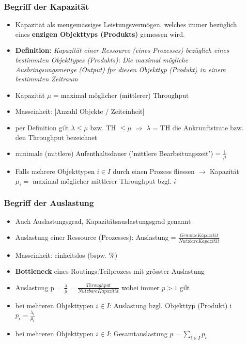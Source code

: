\documentclass{report}
\theoremstyle{definition}
\theoremstyle{example}
\begin{document}
      \subsubsection{Begriff der Kapazität}
\begin{itemize}
   \item Kapazität als mengemässiges Leistungsvermögen, welches immer bezüglich eines \textbf{enzigen Objekttyps (Produkts)} gemessen wird.\\
   \item \textbf{Definition:} \textit{Kapazität einer Ressource (eines Prozesses) bezüglich eines bestimmten Objekttypes (Produkts): Die maximal mögliche Ausbringsungsmenge (Output) fpr diesen Objekttyp (Produkt) in einem bestimmten Zeitraum}\\
   \item Kapazität $\mu$ = maximal möglicher (mittlerer) Throughput 
   \item Masseinheit: [Anzahl Objekte / Zeiteinheit]
   \item per Definition gilt $\lambda \leq \mu$ bzw. TH $\leq \mu$ $\Rightarrow$ $\lambda$ = TH die Ankrunftstrate bzw. den Throughput bezeichnet
   \item minimale (mittlere) Aufenthaltsdauer ('mittlere Bearbeitungszeit') = $\frac{1}{\mu}$
   \item Falls mehrere Objekttypen $i \in I$ durch einen Prozess fliessen $\rightarrow$ Kapazität $\mu_i =$ maximal möglicher mittlerer Throughput bzgl. $i$
\end{itemize}

      \subsubsection{Begriff der Auslastung}
\begin{itemize}
   \item Auch Auslastungsgrad, Kapazitätsauslastungsgrad genannt
   \item Auslastung einer Ressource (Prozesses): Auslastung = $\frac{Genutze Kapazität}{Nutzbare Kapazität}$
   \item Masseinheit: einheitslos (bspw. \%)
   \item \textbf{Bottleneck} eines Routings:Teilprozess mit grösster Auslastung
   \item Auslastung p = $\frac{\lambda}{\mu}$ = $\frac{Throughput}{Nutzbare Kapazität}$ wobei immer $p > 1$ gilt
   \item bei mehreren Objekttypen $i \in I$: Auslastung bzgl. Objekttyp (Produkt) i $p_i = \frac{\lambda_i}{\mu_i}$
   \item bei mehreren Objekttypen $i \in I$: Gesamtauslastung $p = \sum_{i \in I} p_i$
\end{itemize}
\end{document}
